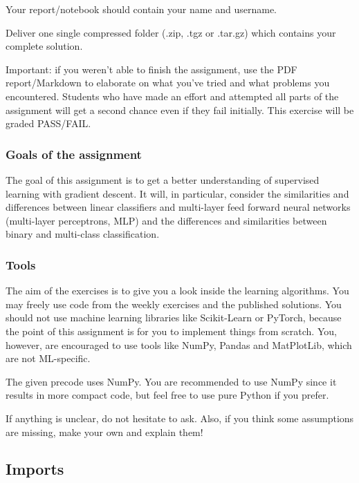 \documentclass[a4paper,landscape]{article}
\begin{document}
Your report/notebook should contain your name and username.

Deliver one single compressed folder (.zip, .tgz or .tar.gz) which
contains your complete solution.

Important: if you weren't able to finish the assignment, use the PDF
report/Markdown to elaborate on what you've tried and what problems you
encountered. Students who have made an effort and attempted all parts of
the assignment will get a second chance even if they fail initially.
This exercise will be graded PASS/FAIL.

    \subsubsection{Goals of the assignment}\label{goals-of-the-assignment}

The goal of this assignment is to get a better understanding of
supervised learning with gradient descent. It will, in particular,
consider the similarities and differences between linear classifiers and
multi-layer feed forward neural networks (multi-layer perceptrons, MLP)
and the differences and similarities between binary and multi-class
classification.

\subsubsection{Tools}\label{tools}

The aim of the exercises is to give you a look inside the learning
algorithms. You may freely use code from the weekly exercises and the
published solutions. You should not use machine learning libraries like
Scikit-Learn or PyTorch, because the point of this assignment is for you
to implement things from scratch. You, however, are encouraged to use
tools like NumPy, Pandas and MatPlotLib, which are not ML-specific.

The given precode uses NumPy. You are recommended to use NumPy since it
results in more compact code, but feel free to use pure Python if you
prefer.

If anything is unclear, do not hesitate to ask. Also, if you think some
assumptions are missing, make your own and explain them!

    \subsection{Imports}\label{imports}
\end{document}
